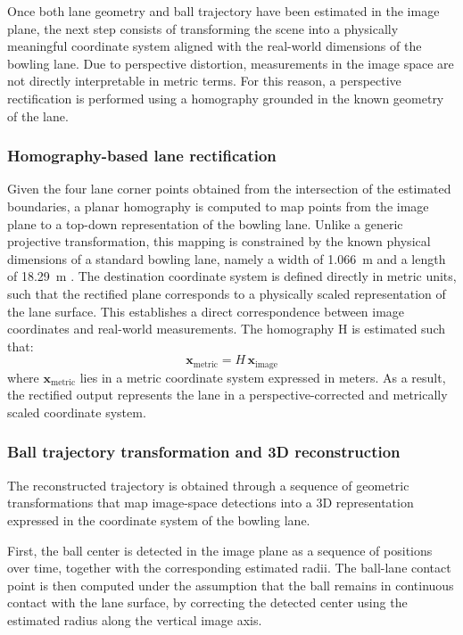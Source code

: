 Once both lane geometry and ball trajectory have been estimated in the image plane, the next step consists of transforming the scene into a physically meaningful coordinate system aligned with the real-world dimensions of the bowling lane. Due to perspective distortion, measurements in the image space are not directly interpretable in metric terms. For this reason, a perspective rectification is performed using a homography grounded in the known geometry of the lane.
\subsubsection{Homography-based lane rectification}
Given the four lane corner points obtained from the intersection of the estimated boundaries, a planar homography is computed to map points from the image plane to a top-down representation of the bowling lane. Unlike a generic projective transformation, this mapping is constrained by the known physical dimensions of a standard bowling lane, namely a width of 1.066~m and a length of 18.29~m \cite{lane_dimensions}.
The destination coordinate system is defined directly in metric units, such that the rectified plane corresponds to a physically scaled representation of the lane surface. This establishes a direct correspondence between image coordinates and real-world measurements.
The homography H is estimated such that:
\[\mathbf{x}_{\mathrm{metric}} = H\,\mathbf{x}_{\mathrm{image}}\]
where $\mathbf{x}_{\mathrm{metric}}$ lies in a metric coordinate system expressed in meters.
As a result, the rectified output represents the lane in a perspective-corrected and metrically scaled coordinate system.


\subsubsection{Ball trajectory transformation and 3D reconstruction}
The reconstructed trajectory is obtained through a sequence of geometric transformations that map image-space detections into a 3D representation expressed in the coordinate system of the bowling lane.

First, the ball center is detected in the image plane as a sequence of positions over time, together with the corresponding estimated radii. The ball-lane contact point is then computed under the assumption that the ball remains in continuous contact with the lane surface, by correcting the detected center using the estimated radius along the vertical image axis.

